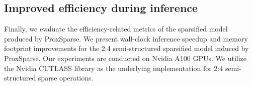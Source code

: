 \subsection{Improved efficiency during inference}

\label{app:effi}
Finally, we evaluate the efficiency-related metrics of the sparsified model produced by ProxSparse. We present wall-clock inference speedup and memory footprint improvements for the 2:4 semi-structured sparsified model induced by ProxSparse. Our experiments are conducted on Nvidia A100 GPUs. We utilize the Nvidia CUTLASS library as the underlying implementation for 2:4 semi-structured sparse operations.

\begin{table}[!t]
    \centering
    \caption{Speedup and memory utilization improvements achieved by ProxSparse induced 2:4 sparsity models(left: speedup, right: memory reduction). ProxSparse delivers a 1.3x–1.35x speedup for matrix multiplication and a 1.26x end-to-end inference speedup on the Mistral-v0.3-7b model. Additionally, ProxSparse reduces memory consumption by 29.5\%–37.3\% across different models, demonstrating its efficiency in both computation and memory utilization.}
    \vspace{0.5em}
    \label{memory}
\end{table}
